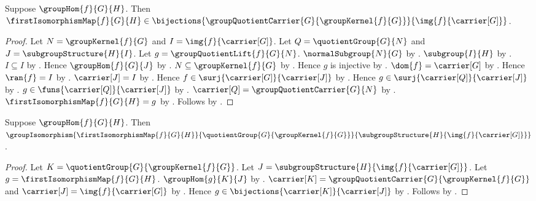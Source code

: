 \begin{theorem}\label{first_isomorphism_map_bijection}
    Suppose $\groupHom{f}{G}{H}$.
    Then $\firstIsomorphismMap{f}{G}{H}\in
        \bijections{
            \groupQuotientCarrier{G}{\groupKernel{f}{G}}}
            {\img{f}{\carrier[G]}}$.
\end{theorem}
\begin{proof}
    Let $N=\groupKernel{f}{G}$ and
        $I=\img{f}{\carrier[G]}$.
    Let $Q=\quotientGroup{G}{N}$ and
        $J=\subgroupStructure{H}{I}$.
    Let $g=\groupQuotientLift{f}{G}{N}$.
    $\normalSubgroup{N}{G}$ by .
    $\subgroup{I}{H}$ by .
    $I\subseteq I$ by .
    Hence $\groupHom{f}{G}{J}$ by
        .
    $N\subseteq\groupKernel{f}{G}$ by .
    Hence $g$ is injective by
        .
    $\dom{f}=\carrier[G]$ by .
    Hence $\ran{f}=I$ by .
    $\carrier[J]=I$ by .
    Hence $f\in\surj{\carrier[G]}{\carrier[J]}$ by
        .
    Hence $g\in\surj{\carrier[Q]}{\carrier[J]}$ by
        .
    $g\in\funs{\carrier[Q]}{\carrier[J]}$ by
        .
    $\carrier[Q]=\groupQuotientCarrier{G}{N}$ by
        .
    $\firstIsomorphismMap{f}{G}{H}=g$ by
        .
    Follows by .
\end{proof}

\begin{theorem}\label{first_isomorphism_theorem}
    Suppose $\groupHom{f}{G}{H}$.
    Then
        $\groupIsomorphism
            {\firstIsomorphismMap{f}{G}{H}}
            {\quotientGroup{G}{\groupKernel{f}{G}}}
            {\subgroupStructure{H}{\img{f}{\carrier[G]}}}$.
\end{theorem}
\begin{proof}
    Let $K=\quotientGroup{G}{\groupKernel{f}{G}}$.
    Let $J=\subgroupStructure{H}{\img{f}{\carrier[G]}}$.
    Let $g=\firstIsomorphismMap{f}{G}{H}$.
    $\groupHom{g}{K}{J}$ by .
    $\carrier[K]=
        \groupQuotientCarrier{G}{\groupKernel{f}{G}}$ and
        $\carrier[J]=\img{f}{\carrier[G]}$ by
        .
    Hence $g\in\bijections{\carrier[K]}{\carrier[J]}$ by
        .
    Follows by .
\end{proof}
